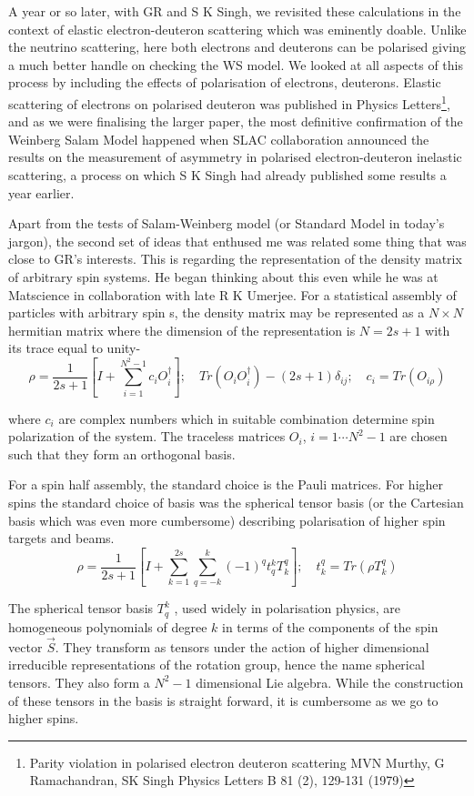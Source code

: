 A year or so later, with GR and S K Singh, we revisited these calculations in the context of elastic electron-deuteron scattering which was eminently doable. Unlike the neutrino scattering, here both electrons and deuterons can be polarised giving a much better handle on checking the WS model. We looked at all aspects of this process by including the effects of polarisation of electrons, deuterons. Elastic scattering of electrons on polarised deuteron was published in Physics Letters\footnote{Parity violation in polarised electron deuteron scattering MVN Murthy, G Ramachandran, SK Singh Physics Letters B 81 (2), 129-131 (1979)}, and as we were finalising the larger paper, the most definitive confirmation of the Weinberg Salam Model happened when SLAC collaboration announced the results on the measurement of asymmetry in polarised electron-deuteron inelastic scattering, a process on which S K Singh had already published some results a year earlier.

Apart from the tests of Salam-Weinberg model (or Standard Model in today’s jargon), the second set of ideas that enthused me was related some thing that was close to GR’s interests. This is regarding the representation of the density matrix of arbitrary spin systems. He began thinking about this even while he was at Matscience in collaboration with late R K Umerjee. For a statistical assembly of particles with arbitrary spin s, the density matrix may be represented as a $N \times N$ hermitian matrix where the dimension of the representation is $N = 2s + 1$ with its trace equal to unity-
$$
\rho =\dfrac{1}{2s+1}\left[I + \sum\limits_{i=1}^{N^{2}-1} c_{i}O_{i}^{\dagger}\right];\quad Tr(O_{i}O_{i}^{\dagger}) - (2s +1)\delta_{ij}; \quad c_{i}=Tr(O_{i\rho})
$$

where $c_{i}$ are complex numbers which in suitable combination determine spin polarization of the system. The traceless matrices $O_{i}$, $i = 1 \cdots N^{2}-1$ are chosen such that they form an orthogonal basis.

For a spin half assembly, the standard choice is the Pauli matrices. For higher spins the standard choice of basis was the spherical tensor basis (or the Cartesian basis which was even more cumbersome) describing polarisation of
higher spin targets and beams.
$$
\rho= \dfrac{1}{2s+1}\left[I + \sum\limits_{k=1}^{2s}\sum\limits_{q=-k}^{k}(-1)^{q}t_{q}^{k}T_{k}^{q}\right]; \quad t_{k}^{q}= Tr(\rho T_{k}^{q})
$$

The spherical tensor basis $T_{q}^{k}$ , used widely in polarisation physics, are homogeneous polynomials of degree $k$ in terms of the components of the spin vector $\vec{S}$. They transform as tensors under the action of higher dimensional irreducible representations of the rotation group, hence the name spherical tensors. They also form a $N^{2}-1$ dimensional Lie algebra. While the construction of these tensors in the basis is straight forward, it is cumbersome as we go to higher spins.

